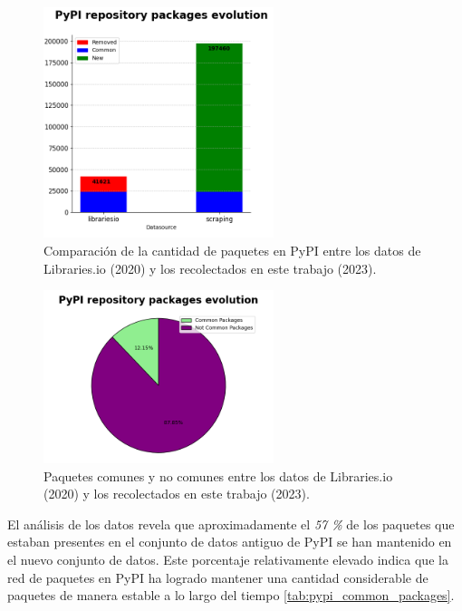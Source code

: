 \begin{figure}[ht!]
    \begin{center}
        \includegraphics[width=0.6\textwidth]{img/pypi/bar_common_packages.png}
        \caption{Comparación de la cantidad de paquetes en PyPI entre los datos de Libraries.io (2020) y los recolectados en este trabajo (2023).}
        \label{fig:pipy_common_packages_bar}
    \end{center}
\end{figure}

\begin{figure}[ht!]
    \begin{center}
        \includegraphics[width=0.6\textwidth]{img/pypi/circ_common_packages.png}
        \caption{Paquetes comunes y no comunes entre los datos de Libraries.io (2020) y los recolectados en este trabajo (2023).}
        \label{fig:pipy_common_packages_circle}
    \end{center}
\end{figure}

El análisis de los datos revela que aproximadamente el \textit{57 \%} de los paquetes que estaban
presentes en el conjunto de datos antiguo de PyPI se han mantenido en el nuevo conjunto de datos. Este porcentaje
relativamente elevado indica que la red de paquetes en PyPI ha logrado mantener una cantidad considerable
de paquetes de manera estable a lo largo del tiempo \ref{tab:pypi_common_packages}.

